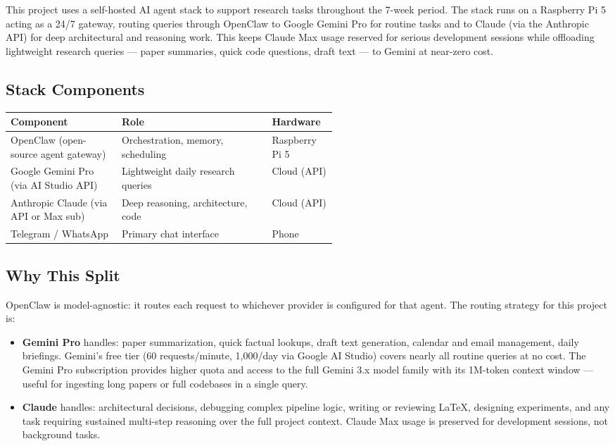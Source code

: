 \documentclass[11pt]{article}
\begin{document}
This project uses a self-hosted AI agent stack to support research tasks throughout the
7-week period. The stack runs on a Raspberry Pi 5 acting as a 24/7 gateway, routing
queries through OpenClaw to Google Gemini Pro for routine tasks and to Claude (via the
Anthropic API) for deep architectural and reasoning work. This keeps Claude Max usage
reserved for serious development sessions while offloading lightweight research queries
--- paper summaries, quick code questions, draft text --- to Gemini at near-zero cost.

\subsection*{Stack Components}

\begin{center}
\begin{tabularx}{\linewidth}{p{0.34\linewidth}Xp{0.20\linewidth}}
\toprule
\textbf{Component} & \textbf{Role} & \textbf{Hardware} \\
\midrule
OpenClaw (open-source agent gateway) & Orchestration, memory, scheduling & Raspberry Pi 5 \\
Google Gemini Pro (via AI Studio API) & Lightweight daily research queries & Cloud (API) \\
Anthropic Claude (via API or Max sub) & Deep reasoning, architecture, code & Cloud (API) \\
Telegram / WhatsApp & Primary chat interface & Phone \\
\bottomrule
\end{tabularx}
\end{center}

\subsection*{Why This Split}

OpenClaw is model-agnostic: it routes each request to whichever provider is configured
for that agent. The routing strategy for this project is:

\begin{itemize}[leftmargin=1.6em, itemsep=3pt]
  \item \textbf{Gemini Pro} handles: paper summarization, quick factual lookups,
        draft text generation, calendar and email management, daily briefings.
        Gemini's free tier (60 requests/minute, 1,000/day via Google AI Studio)
        covers nearly all routine queries at no cost. The Gemini Pro subscription
        provides higher quota and access to the full Gemini 3.x model family with
        its 1M-token context window --- useful for ingesting long papers or
        full codebases in a single query.
  \item \textbf{Claude} handles: architectural decisions, debugging complex pipeline
        logic, writing or reviewing LaTeX, designing experiments, and any task
        requiring sustained multi-step reasoning over the full project context.
        Claude Max usage is preserved for development sessions, not background tasks.
\end{itemize}
\end{document}
